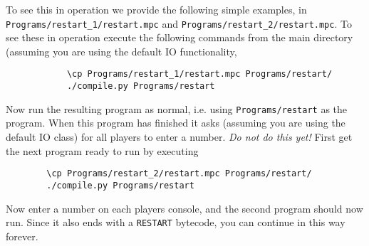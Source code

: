 To see this in operation we provide the following simple
examples, in \verb+Programs/restart_1/restart.mpc+
and \verb+Programs/restart_2/restart.mpc+.
To see these in operation execute the following commands
from the main directory (assuming you are using the
default IO functionality,
\begin{verbatim}
            \cp Programs/restart_1/restart.mpc Programs/restart/
            ./compile.py Programs/restart
\end{verbatim}
Now run the resulting program as normal, i.e. using \verb+Programs/restart+
as the program.
When this program has finished it asks (assuming you are
using the default IO class) for all players to enter
a number. {\em Do not do this yet!}
First get the next program ready to run by executing
\begin{verbatim}
        \cp Programs/restart_2/restart.mpc Programs/restart/
        ./compile.py Programs/restart
\end{verbatim}
Now enter a number on each players console, and 
the second program should now run.
Since it also ends with a \verb+RESTART+ bytecode, you can
continue in this way forever.
